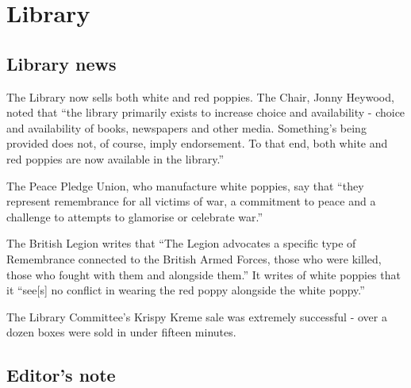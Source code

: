 \documentclass[11pt,a4paper]{report}
\begin{document}
	
	
	\setlength{\parskip}{0em}
	\tableofcontents
	\setlength{\parskip}{1.25em}
		
\chapter{Library}\label{introduction}

\section{Library news}\label{library-news}

\begin{multicols}{2}
	
The Library now sells both white and red poppies. The Chair, Jonny
Heywood, noted that ``the library primarily exists to increase choice
and availability - choice and availability of books, newspapers and
other media. Something's being provided does not, of course, imply
endorsement. To that end, both white and red poppies are now available
in the library.''

The Peace Pledge Union, who manufacture white poppies, say that ``they
represent remembrance for all victims of war, a commitment to peace and
a challenge to attempts to glamorise or celebrate war.''

The British Legion writes that ``The Legion advocates a specific type of
Remembrance connected to the British Armed Forces, those who were
killed, those who fought with them and alongside them.'' It writes of
white poppies that it ``see{[}s{]} no conflict in wearing the red poppy
alongside the white poppy.''

The Library Committee's Krispy Kreme sale was extremely successful -
over a dozen boxes were sold in under fifteen minutes.


\end{multicols}

\section{Editor's note}\label{editors-note}
\end{document}
